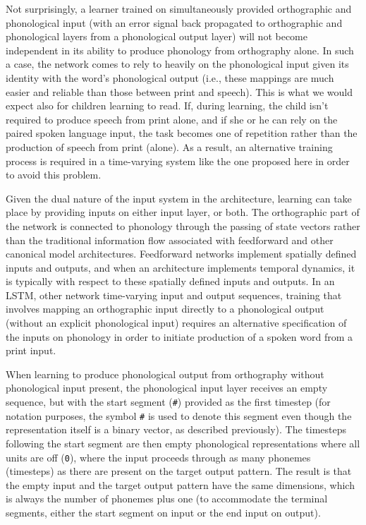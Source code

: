 \documentclass[
  american,
  man,floatsintext]{apa6}
\begin{document}
Not surprisingly, a learner trained on simultaneously provided orthographic and phonological input (with an error signal back propagated to orthographic and phonological layers from a phonological output layer) will not become independent in its ability to produce phonology from orthography alone. In such a case, the network comes to rely to heavily on the phonological input given its identity with the word's phonological output (i.e., these mappings are much easier and reliable than those between print and speech). This is what we would expect also for children learning to read. If, during learning, the child isn't required to produce speech from print alone, and if she or he can rely on the paired spoken language input, the task becomes one of repetition rather than the production of speech from print (alone). As a result, an alternative training process is required in a time-varying system like the one proposed here in order to avoid this problem.

Given the dual nature of the input system in the architecture, learning can take place by providing inputs on either input layer, or both. The orthographic part of the network is connected to phonology through the passing of state vectors rather than the traditional information flow associated with feedforward and other canonical model architectures. Feedforward networks implement spatially defined inputs and outputs, and when an architecture implements temporal dynamics, it is typically with respect to these spatially defined inputs and outputs. In an LSTM, other network time-varying input and output sequences, training that involves mapping an orthographic input directly to a phonological output (without an explicit phonological input) requires an alternative specification of the inputs on phonology in order to initiate production of a spoken word from a print input.

When learning to produce phonological output from orthography without phonological input present, the phonological input layer receives an empty sequence, but with the start segment (\texttt{\#}) provided as the first timestep (for notation purposes, the symbol \texttt{\#} is used to denote this segment even though the representation itself is a binary vector, as described previously). The timesteps following the start segment are then empty phonological representations where all units are off (\texttt{0}), where the input proceeds through as many phonemes (timesteps) as there are present on the target output pattern. The result is that the empty input and the target output pattern have the same dimensions, which is always the number of phonemes plus one (to accommodate the terminal segments, either the start segment on input or the end input on output).
\end{document}
